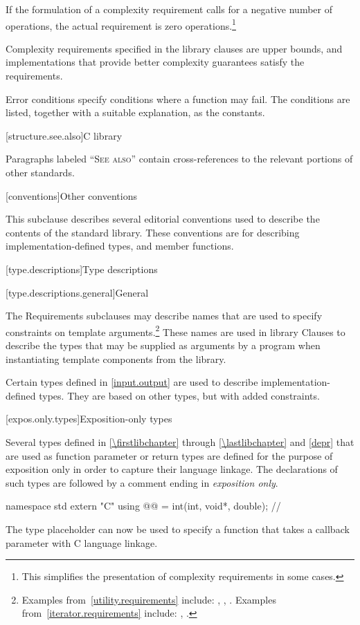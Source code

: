 \pnum
If the formulation of a complexity requirement calls for a negative number of
operations, the actual requirement is zero operations.\footnote{This simplifies
the presentation of complexity requirements in some cases.}

\pnum
Complexity requirements specified in the library clauses are upper bounds,
and implementations that provide better complexity guarantees satisfy
the requirements.

\pnum
Error conditions specify conditions where a function may fail. The conditions
are listed, together with a suitable explanation, as the 
constants.

[structure.see.also]{C library}

\pnum
Paragraphs labeled ``\textsc{See also}'' contain cross-references to the relevant portions
of other standards.

[conventions]{Other conventions}
%

\pnum
This subclause describes several editorial conventions used to describe the contents
of the \Cpp{} standard library.
These conventions are for describing
implementation-defined types,
and member functions.

[type.descriptions]{Type descriptions}

[type.descriptions.general]{General}

\pnum
The Requirements subclauses may describe names that are used to specify
constraints on template arguments.\footnote{Examples
from~\ref{utility.requirements} include:
,
,
.
Examples from~\ref{iterator.requirements} include:
,
.}
These names are used in library Clauses
to describe the types that
may be supplied as arguments by a \Cpp{} program when instantiating template components from
the library.

\pnum
Certain types defined in \ref{input.output} are used to describe implementation-defined types.
%
They are based on other types, but with added constraints.

[expos.only.types]{Exposition-only types}

\pnum
Several types defined in \ref{\firstlibchapter} through \ref{\lastlibchapter}
and \ref{depr} that are used as function parameter or return types are defined
for the purpose of exposition only in order to capture their language linkage. The
declarations of such types are followed by a comment ending in \textit{exposition only}.
\begin{example}
\begin{codeblock}
namespace std {
  extern "C" using @@ = int(int, void*, double);  // \expos
}
\end{codeblock}
The type placeholder  can now be used to specify a function
that takes a callback parameter with C language linkage.
\end{example}

